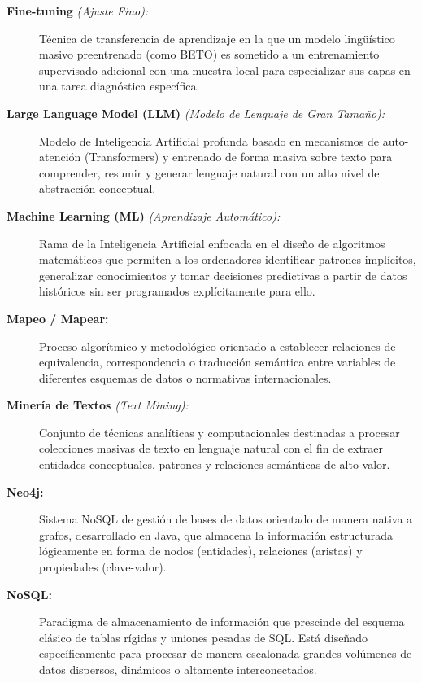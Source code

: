\documentclass[12pt,a4paper,onecolumn,oneside]{report}
\begin{document}
\begin{description}
    \item[\textbf{Fine-tuning} \textit{(Ajuste Fino):}] Técnica de transferencia de aprendizaje en la que un modelo lingüístico masivo preentrenado (como BETO) es sometido a un entrenamiento supervisado adicional con una muestra local para especializar sus capas en una tarea diagnóstica específica.
    
    \item[\textbf{Large Language Model (LLM)} \textit{(Modelo de Lenguaje de Gran Tamaño):}] Modelo de Inteligencia Artificial profunda basado en mecanismos de auto-atención (Transformers) y entrenado de forma masiva sobre texto para comprender, resumir y generar lenguaje natural con un alto nivel de abstracción conceptual.
    
    \item[\textbf{Machine Learning (ML)} \textit{(Aprendizaje Automático):}] Rama de la Inteligencia Artificial enfocada en el diseño de algoritmos matemáticos que permiten a los ordenadores identificar patrones implícitos, generalizar conocimientos y tomar decisiones predictivas a partir de datos históricos sin ser programados explícitamente para ello.
    
    \item[\textbf{Mapeo / Mapear:}] Proceso algorítmico y metodológico orientado a establecer relaciones de equivalencia, correspondencia o traducción semántica entre variables de diferentes esquemas de datos o normativas internacionales.
    
    \item[\textbf{Minería de Textos} \textit{(Text Mining):}] Conjunto de técnicas analíticas y computacionales destinadas a procesar colecciones masivas de texto en lenguaje natural con el fin de extraer entidades conceptuales, patrones y relaciones semánticas de alto valor.
    
    \item[\textbf{Neo4j:}] Sistema NoSQL de gestión de bases de datos orientado de manera nativa a grafos, desarrollado en Java, que almacena la información estructurada lógicamente en forma de nodos (entidades), relaciones (aristas) y propiedades (clave-valor).
    
    \item[\textbf{NoSQL:}] Paradigma de almacenamiento de información que prescinde del esquema clásico de tablas rígidas y uniones pesadas de SQL. Está diseñado específicamente para procesar de manera escalonada grandes volúmenes de datos dispersos, dinámicos o altamente interconectados.
    

\end{description}
\end{document}
